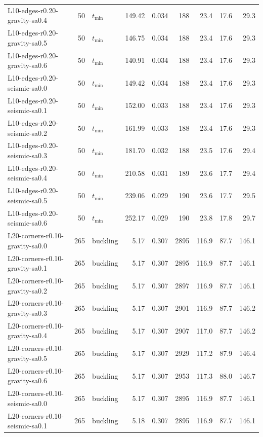 \begin{longtable}{lrlrrrrrr}
L10-edges-r0.20-gravity-sa0.4 & 50 & $t_{\mathrm{min}}$ & 149.42 & 0.034 & 188 & 23.4 & 17.6 & 29.3 \\
L10-edges-r0.20-gravity-sa0.5 & 50 & $t_{\mathrm{min}}$ & 146.75 & 0.034 & 188 & 23.4 & 17.6 & 29.3 \\
L10-edges-r0.20-gravity-sa0.6 & 50 & $t_{\mathrm{min}}$ & 140.91 & 0.034 & 188 & 23.4 & 17.6 & 29.3 \\
L10-edges-r0.20-seismic-sa0.0 & 50 & $t_{\mathrm{min}}$ & 149.42 & 0.034 & 188 & 23.4 & 17.6 & 29.3 \\
L10-edges-r0.20-seismic-sa0.1 & 50 & $t_{\mathrm{min}}$ & 152.00 & 0.033 & 188 & 23.4 & 17.6 & 29.3 \\
L10-edges-r0.20-seismic-sa0.2 & 50 & $t_{\mathrm{min}}$ & 161.99 & 0.033 & 188 & 23.4 & 17.6 & 29.3 \\
L10-edges-r0.20-seismic-sa0.3 & 50 & $t_{\mathrm{min}}$ & 181.70 & 0.032 & 188 & 23.5 & 17.6 & 29.4 \\
L10-edges-r0.20-seismic-sa0.4 & 50 & $t_{\mathrm{min}}$ & 210.58 & 0.031 & 189 & 23.6 & 17.7 & 29.4 \\
L10-edges-r0.20-seismic-sa0.5 & 50 & $t_{\mathrm{min}}$ & 239.06 & 0.029 & 190 & 23.6 & 17.7 & 29.5 \\
L10-edges-r0.20-seismic-sa0.6 & 50 & $t_{\mathrm{min}}$ & 252.17 & 0.029 & 190 & 23.8 & 17.8 & 29.7 \\
L20-corners-r0.10-gravity-sa0.0 & 265 & buckling & 5.17 & 0.307 & 2895 & 116.9 & 87.7 & 146.1 \\
L20-corners-r0.10-gravity-sa0.1 & 265 & buckling & 5.17 & 0.307 & 2895 & 116.9 & 87.7 & 146.1 \\
L20-corners-r0.10-gravity-sa0.2 & 265 & buckling & 5.17 & 0.307 & 2897 & 116.9 & 87.7 & 146.1 \\
L20-corners-r0.10-gravity-sa0.3 & 265 & buckling & 5.17 & 0.307 & 2901 & 116.9 & 87.7 & 146.2 \\
L20-corners-r0.10-gravity-sa0.4 & 265 & buckling & 5.17 & 0.307 & 2907 & 117.0 & 87.7 & 146.2 \\
L20-corners-r0.10-gravity-sa0.5 & 265 & buckling & 5.17 & 0.307 & 2929 & 117.2 & 87.9 & 146.4 \\
L20-corners-r0.10-gravity-sa0.6 & 265 & buckling & 5.17 & 0.307 & 2953 & 117.3 & 88.0 & 146.7 \\
L20-corners-r0.10-seismic-sa0.0 & 265 & buckling & 5.17 & 0.307 & 2895 & 116.9 & 87.7 & 146.1 \\
L20-corners-r0.10-seismic-sa0.1 & 265 & buckling & 5.18 & 0.307 & 2895 & 116.9 & 87.7 & 146.1 \\

\end{longtable}
